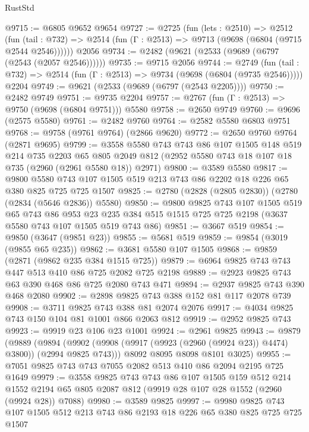 \begin{lexlean}{RustStd}
\begin{coremodule}
@9715 := @6805 @9652 @9654
@9727 := @2725
    (fun (lets : @2510) =>
    @2512
      (fun (tail : @732) => @2514 (fun (Γ : @2513) => @9713 (@9698 (@6804 (@9715 @2544 @2546))))))
    @2056
@9734 := @2482 (@9621 (@2533 (@9689 (@6797 (@2543 (@2057 @2546))))))
@9735 := @9715 @2056
@9744 := @2749
    (fun (tail : @732) => @2514 (fun (Γ : @2513) => @9734 (@9698 (@6804 (@9735 @2546)))))
    @2204
@9749 := @9621 (@2533 (@9689 (@6797 (@2543 @2205))))
@9750 := @2482 @9749
@9751 := @9735 @2204
@9757 := @2767 (fun (Γ : @2513) => @9750 (@9698 (@6804 @9751))) @5580
@9758 := @2650 @9749
@9760 := @9696 (@2575 @5580)
@9761 := @2482 @9760
@9764 := @2582 @5580 @6803 @9751
@9768 := @9758 (@9761 @9764) (@2866 @9620)
@9772 := @2650 @9760 @9764 (@2871 @9695)
@9799 := @3558
    @5580
    @743
    @743
    @86
    @107
    @1505
    @148
    @519
    @214
    @735
    @2203
    @65
    @805
    @2049
    @812
    (@2952 @5580 @743 @18 @107 @18 @735 (@2960 (@2961 @5580 @18)) @2971)
@9800 := @3589 @5580
@9817 := @9800 @5580 @743 @107 @1505 @519 @213 @743 @86 @2202 @18 @226 @65 @380 @825 @725 @725 @1507
@9825 := @2780 (@2828 (@2805 @2830)) (@2780 (@2834 (@5646 @2836)) @5580)
@9850 := @9800
    @9825
    @743
    @107
    @1505
    @519
    @65
    @743
    @86
    @953
    @23
    @235
    @384
    @515
    @1515
    @725
    @725
    @2198
    (@3637 @5580 @743 @107 @1505 @519 @743 @86)
@9851 := @3667 @519
@9854 := @9850 (@3647 (@9851 @23))
@9855 := @5681 @519
@9859 := @9854 (@3019 (@9855 @65 @235))
@9862 := @3681 @5580 @107 @1505
@9868 := @9859 (@2871 (@9862 @235 @384 @1515 @725))
@9879 := @6964 @9825 @743 @743 @447 @513 @410 @86 @725 @2082 @725 @2198
@9889 := @2923 @9825 @743 @63 @390 @468 @86 @725 @2080 @743 @471
@9894 := @2937 @9825 @743 @390 @468 @2080
@9902 := @2898 @9825 @743 @388 @152 @81 @117 @2078 @739
@9908 := @3711 @9825 @743 @388 @81 @2074 @2076
@9917 := @4034 @9825 @743 @150 @104 @81 @1001 @866 @2063 @812
@9919 := @2952 @9825 @743
@9923 := @9919 @23 @106 @23 @1001
@9924 := @2961 @9825
@9943 := @9879
    (@9889
      (@9894 (@9902 (@9908 (@9917 (@9923 (@2960 (@9924 @23)) @4474) @3800)) (@2994 @9825 @743)))
      @8092
      @8095
      @8098
      @8101
      @3025)
@9955 := @7051 @9825 @743 @743 @7055 @2082 @513 @410 @86 @2094 @2195 @725 @1649
@9979 := @3558
    @9825
    @743
    @743
    @86
    @107
    @1505
    @159
    @512
    @214
    @1552
    @2194
    @65
    @805
    @2087
    @812
    (@9919 @28 @107 @28 @1552 (@2960 (@9924 @28)) @7088)
@9980 := @3589 @9825
@9997 := @9980 @9825 @743 @107 @1505 @512 @213 @743 @86 @2193 @18 @226 @65 @380 @825 @725 @725 @1507

\end{coremodule}
\end{lexlean}
